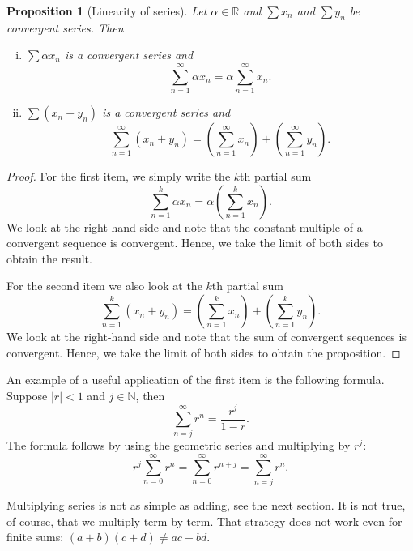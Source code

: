 \documentclass[12pt]{book}
\newcommand{\abs}[1]{\left\lvert {#1} \right\rvert}
\newcommand{\R}{{\mathbb{R}}}
\newcommand{\N}{{\mathbb{N}}}
\theoremstyle{plain}
\newtheorem{prop}[thm]{Proposition}
\theoremstyle{remark}
\theoremstyle{definition}
\theoremstyle{exercise}
\theoremstyle{example}
\begin{document}
\begin{prop}[Linearity of series]
Let $\alpha \in \R$ and $\sum x_n$ and $\sum y_n$ be
convergent series.  Then
\begin{enumerate}[(i)]
\item
$\sum \alpha x_n$ is a convergent series and
\begin{equation*}
\sum_{n=1}^\infty \alpha x_n
=
\alpha \sum_{n=1}^\infty x_n .
\end{equation*}
\item
$\sum ( x_n + y_n )$ is a convergent series and
\begin{equation*}
\sum_{n=1}^\infty ( x_n + y_n ) 
=
\left( \sum_{n=1}^\infty x_n \right)
+
\left( \sum_{n=1}^\infty y_n \right) .
\end{equation*}
\end{enumerate}
\end{prop}

\begin{proof}
For the first item,
we simply write the $k$th partial sum
\begin{equation*}
\sum_{n=1}^k \alpha x_n
=
\alpha \left( \sum_{n=1}^k x_n \right) .
\end{equation*}
We look at the right-hand side and note that the constant multiple of
a convergent sequence
is convergent.  Hence, we take the limit of both sides to obtain
the result.

For the second item we also look at the
$k$th partial sum
\begin{equation*}
\sum_{n=1}^k ( x_n + y_n ) 
=
\left( \sum_{n=1}^k x_n \right)
+
\left( \sum_{n=1}^k y_n \right) .
\end{equation*}
We look at the right-hand side and note that the sum of convergent sequences
is convergent.  Hence, we take the limit of both sides to obtain
the proposition.
\end{proof}

An example of a useful application of the first item is the following
formula.  Suppose $\abs{r} < 1$ and $j \in \N$, then
\begin{equation*}
\sum_{n=j}^\infty r^n = \frac{r^j}{1-r} .
\end{equation*}
The formula follows by using the geometric series and multiplying by
$r^j$:
\begin{equation*}
r^j \sum_{n=0}^\infty r^n =
\sum_{n=0}^\infty r^{n+j}
=
\sum_{n=j}^\infty r^n .
\end{equation*}

Multiplying series is not as simple as adding, see the next
section.
It is not true, of course, that we multiply
term by term.  That strategy does not work even for finite sums:
$(a+b)(c+d) \not= ac+bd$.
\end{document}
